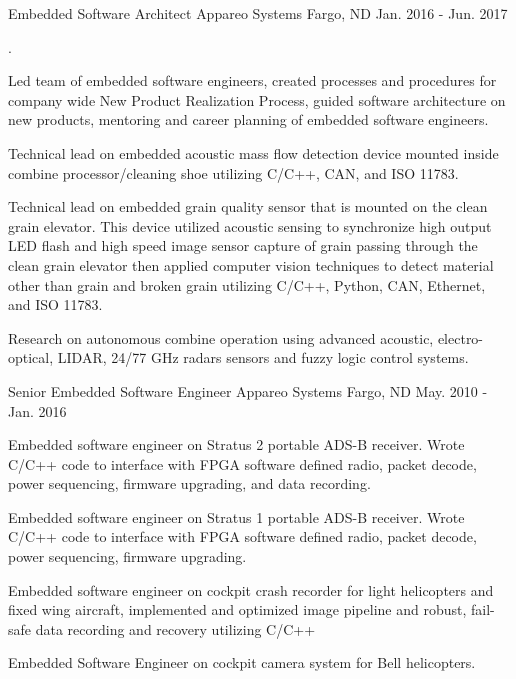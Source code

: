 \begin{cventries}
  \cventry
    {Embedded Software Architect} %
    {Appareo Systems} %
    {Fargo, ND} %
    {Jan. 2016 - Jun. 2017} %
    {.
      \begin{cvitems} %
        \item {Led team of embedded software engineers, created processes and procedures for company wide New Product Realization Process, guided software architecture on new products, mentoring and career planning of embedded software engineers.}
        \item {Technical lead on embedded acoustic mass flow detection device mounted inside combine processor/cleaning shoe utilizing C/C++, CAN, and ISO 11783.}
        \item {Technical lead on embedded grain quality sensor that is mounted on the clean grain elevator. This device utilized acoustic sensing to synchronize high output LED flash and high speed image sensor capture of grain passing through the clean grain elevator then applied computer vision techniques to detect material other than grain and broken grain utilizing C/C++, Python, CAN, Ethernet, and ISO 11783.}
        \item {Research on autonomous combine operation using advanced acoustic, electro-optical, LIDAR, 24/77 GHz radars sensors and fuzzy logic control systems.}
      \end{cvitems}
    }

  \cventry
    {Senior Embedded Software Engineer} %
    {Appareo Systems} %
    {Fargo, ND} %
    {May. 2010 - Jan. 2016} %
    {
      \begin{cvitems} %
        \item {Embedded software engineer on Stratus 2 portable ADS-B receiver. Wrote C/C++ code to interface with FPGA software defined radio, packet decode, power sequencing, firmware upgrading, and data recording.}
        \item {Embedded software engineer on Stratus 1 portable ADS-B receiver. Wrote C/C++ code to interface with FPGA software defined radio, packet decode, power sequencing, firmware upgrading.}
        \item {Embedded software engineer on cockpit crash recorder for light helicopters and fixed wing aircraft, implemented and optimized image pipeline and robust, fail-safe data recording and recovery utilizing C/C++}
        \item {Embedded Software Engineer on cockpit camera system for Bell helicopters.}
      \end{cvitems}
    }


\end{cventries}
